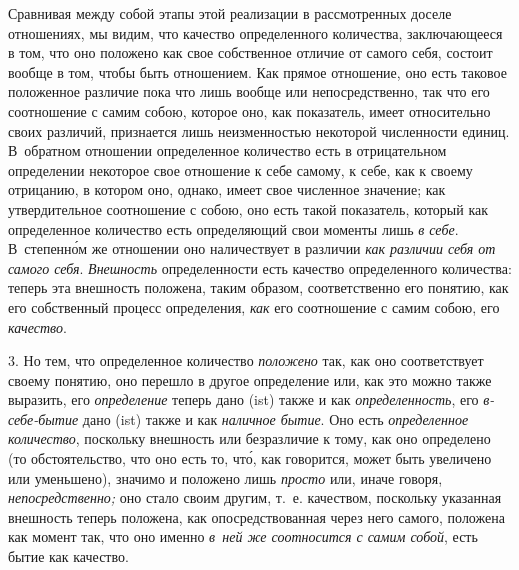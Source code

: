 Сравнивая между собой этапы этой реализации в рассмотренных доселе отношениях,
мы видим, что качество определенного количества, заключающееся в том, что оно
положено как свое собственное отличие от самого себя, состоит вообще в том,
чтобы быть отношением. Как прямое отношение, оно есть таковое положенное
различие пока что лишь вообще или непосредственно, так что его соотношение с
самим собою, которое оно, как показатель, имеет относительно своих различий,
признается лишь неизменностью некоторой численности единиц. В~обратном
отношении определенное количество есть в отрицательном определении некоторое
свое отношение к себе самому, к себе, как к своему отрицанию, в котором оно,
однако, имеет свое численное значение; как утвердительное соотношение с собою,
оно есть такой показатель, который как определенное количество есть
определяющий свои моменты лишь {\em в себе}. В~степенн\'{о}м же отношении оно
наличествует в различии {\em как различии себя от самого себя}. {\em Внешность}
определенности есть качество определенного количества: теперь эта внешность
положена, таким образом, соответственно его понятию, как его собственный
процесс определения, {\em как} его соотношение с самим собою, его
{\em качество}.

3. Но тем, что определенное количество {\em положено} так, как оно
соответствует своему понятию, оно перешло в другое определение или, как это
можно также выразить, его {\em определение} теперь дано (ist) также и как
{\em определенность}, его {\em в-себе-бытие} дано (ist) также и как
{\em наличное бытие}. Оно есть {\em определенное количество}, поскольку
внешность или безразличие к тому, как оно определено (то обстоятельство, что
оно есть то, чт\'{о}, как говорится, может быть увеличено или уменьшено),
значимо и положено лишь {\em просто} или, иначе говоря, {\em непосредственно;}
оно стало своим другим, т.~е. качеством, поскольку указанная внешность теперь
положена, как опосредствованная через него самого, положена как момент так, что
оно именно {\em в~ней же соотносится с самим собой}, есть бытие как качество.

